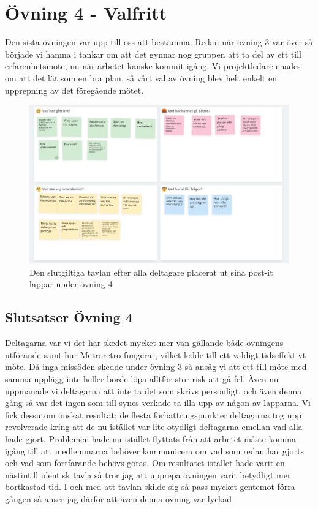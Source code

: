 \documentclass[a4paper, titlepage,12pt]{article}
\begin{document}
	\section{Övning 4 - Valfritt}

		Den sista övningen var upp till oss att bestämma. Redan när övning 3 var över så började vi hamna i tankar om att det gynnar nog gruppen att ta del av ett till erfarenhetsmöte, nu när arbetet kanske kommit igång. Vi projektledare enades om att det lät som en bra plan, så vårt val av övning blev helt enkelt en upprepning av det föregående mötet.

		
		\begin{figure}[h!]
			\includegraphics[scale=0.38]{./metroretro-2.png}
			\caption{Den slutgiltiga tavlan efter alla deltagare placerat ut sina post-it lappar under övning 4}
		\end{figure}

		\subsection{Slutsatser Övning 4}
			
			Deltagarna var vi det här skedet mycket mer van gällande både övningens utförande samt hur Metroretro fungerar, vilket ledde till ett väldigt tidseffektivt möte. Då inga missöden skedde under övning 3 så ansåg vi att ett till möte med samma upplägg inte heller borde löpa alltför stor risk att gå fel. Även nu uppmanade vi deltagarna att inte ta det som skrivs personligt, och även denna gång så var det ingen som till synes verkade ta illa upp av någon av lapparna. Vi fick dessutom önskat resultat; de flesta förbättringspunkter deltagarna tog upp revolverade kring att de nu istället var lite otydligt deltagarna emellan vad alla hade gjort. Problemen hade nu istället flyttats från att arbetet måste komma igång till att medlemmarna behöver kommunicera om vad som redan har gjorts och vad som fortfarande behövs göras. Om resultatet istället hade varit en nästintill identisk tavla så tror jag att upprepa övningen varit betydligt mer bortkastad tid. I och med att tavlan skilde sig så pass mycket gentemot förra gången så anser jag därför att även denna övning var lyckad.
\end{document}
